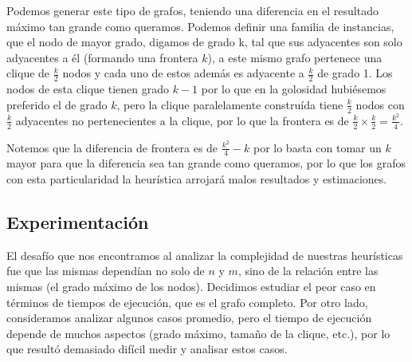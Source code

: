 Podemos generar este tipo de grafos, teniendo una diferencia en el resultado máximo tan grande como queramos. Podemos definir una familia de instancias, que el nodo de mayor grado, digamos de grado k, tal que sus adyacentes son solo adyacentes a él (formando una frontera $k$), a este mismo grafo pertenece una clique de $\frac{k}{2}$ nodos y cada uno de estos además es adyacente a $\frac{k}{2}$ de grado 1. Los nodos de esta clique tienen grado $k - 1$ por lo que en la golosidad hubiésemos preferido el de grado $k$, pero la clique paralelamente construída tiene $\frac{k}{2}$ nodos con $\frac{k}{2}$ adyacentes no pertenecientes a la clique, por lo que la frontera es de $\frac{k}{2} \times \frac{k}{2} = \frac{k^2}{4}$.

Notemos que la diferencia de frontera es de $\frac{k^2}{4} - k$ por lo basta con tomar un $k$ mayor para que la diferencia sea tan grande como queramos, por lo que los grafos con esta particularidad la heurística arrojará malos resultados y estimaciones.

\subsection{Experimentación}

El desafío que nos encontramos al analizar la complejidad de nuestras heurísticas fue que las mismas dependían no solo de $n$ y $m$, sino de la relación entre las mismas (el grado máximo de los nodos). Decidimos estudiar el peor caso en términos de tiempos de ejecución, que es el grafo completo. Por otro lado, consideramos analizar algunos casos promedio, pero el tiempo de ejecución depende de muchos aspectos (grado máximo, tamaño de la clique, etc.), por lo que resultó demasiado difícil medir y analisar estos casos.

